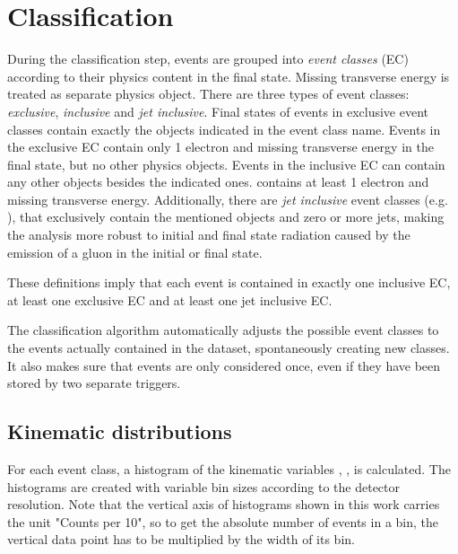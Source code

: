 \section{Classification}
During the classification step, events are grouped into \emph{event classes} (EC) according to their physics content in the final state. 
Missing transverse energy is treated as separate physics object. There are three  types of event classes: \emph{exclusive}, \emph{inclusive} and \emph{jet inclusive}. Final states of events in exclusive event classes contain exactly the objects indicated in the event class name. 
Events in the exclusive EC  contain only 1 electron and missing transverse energy in the final state, but no other physics objects.
Events in the inclusive EC can contain any other objects besides the indicated ones.  contains at least 1 electron and missing transverse energy. 
Additionally, there are \emph{jet inclusive} event classes (e.g. ), that exclusively contain the mentioned objects and zero or more jets, making the analysis more robust to initial and final state radiation caused by the emission of a gluon in the initial or final state.

These definitions imply that each event is contained in exactly one inclusive EC, at least one exclusive EC and at least one jet inclusive EC.

The classification algorithm automatically adjusts the possible event classes to the events actually contained in the dataset, spontaneously creating new classes. It also makes sure that events are only considered once, even if they have been stored by two separate triggers.

\subsection{Kinematic distributions}
For each event class, a histogram of the kinematic variables \sumpT, \Minv, \MET is calculated. The histograms are created with variable bin sizes according to the detector resolution\cite[p. 52]{Papacz2014Model}. Note that the vertical axis of histograms shown in this work carries the unit "Counts per \unit{10}{\GeV}", so to get the absolute number of events in a bin, the vertical data point has to be multiplied by the width of its bin.


